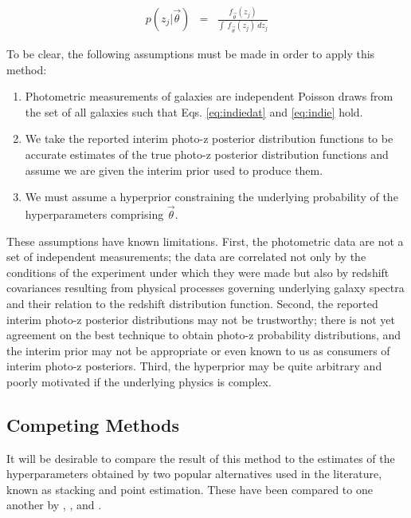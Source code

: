 \documentclass[preprint]{aastex}
\begin{document}
\begin{eqnarray}
\label{eq:params}
p(z_{j}|\vec{\theta}) &=& \frac{f_{\vec{\theta}}(z_{j})}{\int\ 
f_{\vec{\theta}}(z_{j})\ dz_{j}}
\end{eqnarray}

To be clear, the following assumptions must be made in order to apply this 
method:

\begin{enumerate}
\item Photometric measurements of galaxies are independent Poisson draws from 
the set of all galaxies such that Eqs. \ref{eq:indiedat} and \ref{eq:indie} 
hold.
\item We take the reported interim photo-z posterior distribution functions to 
be accurate estimates of the true photo-z posterior distribution functions and 
assume we are given the interim prior used to produce them.
\item We must assume a hyperprior constraining the underlying probability of 
the hyperparameters comprising $\vec{\theta}$.
\end{enumerate}

These assumptions have known limitations.  First, the photometric data are not 
a set of independent measurements; the data are correlated not only by the 
conditions of the experiment under which they were made but also by redshift 
covariances resulting from physical processes governing underlying galaxy 
spectra and their relation to the redshift distribution function.  Second, the 
reported interim photo-z posterior distributions may not be trustworthy; there 
is not yet agreement on the best technique to obtain photo-z probability 
distributions, and the interim prior may not be appropriate or even known to us 
as consumers of interim photo-z posteriors.  Third, the hyperprior may be quite 
arbitrary and poorly motivated if the underlying physics is complex.

\clearpage
\subsection{Competing Methods}
\label{sec:sheldon}

It will be desirable to compare the result of this method to the estimates of 
the hyperparameters obtained by two popular alternatives used in the 
literature, known as stacking and point estimation.   These have been compared 
to one another by \citet{Hildebrandt2012}, \citet{Benjamin2013}, and 
\citet{Asorey2016}.
\end{document}
